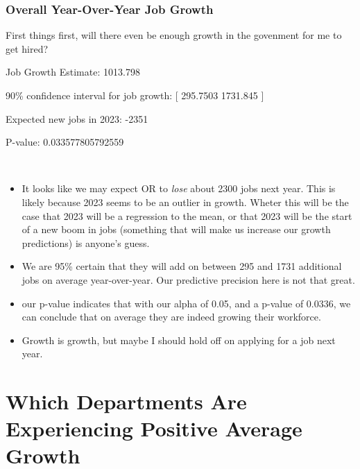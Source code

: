 \documentclass[letterpaper]{article}
\theoremstyle{definition}
\begin{document}
\hypertarget{overall-year-over-year-job-growth}{%
\subsubsection{Overall Year-Over-Year Job
Growth}\label{overall-year-over-year-job-growth}}

First things first, will there even be enough growth in the govenment
for me to get hired?

    

Job Growth Estimate:  1013.798


90\% confidence interval for job growth: [ 295.7503 1731.845 ]


Expected new jobs in 2023:  -2351


P-value:  0.033577805792559

    \begin{center}
    \end{center}
    { \hspace*{\fill} \\}
    
    \begin{itemize}
\item
  It looks like we may expect OR to \emph{lose} about 2300 jobs next
  year. This is likely because 2023 seems to be an outlier in growth.
  Wheter this will be the case that 2023 will be a regression to the
  mean, or that 2023 will be the start of a new boom in jobs (something
  that will make us increase our growth predictions) is anyone's guess.
\item
  We are 95\% certain that they will add on between 295 and 1731
  additional jobs on average year-over-year. Our predictive precision
  here is not that great.
\item
  our p-value indicates that with our alpha of 0.05, and a p-value of
  0.0336, we can conclude that on average they are indeed growing their
  workforce.
\item
  Growth is growth, but maybe I should hold off on applying for a job
  next year.
\end{itemize}

    \hypertarget{which-departments-are-experiencing-positive-average-growth}{%
\section{Which Departments Are Experiencing Positive Average
Growth}\label{which-departments-are-experiencing-positive-average-growth}}
\end{document}
